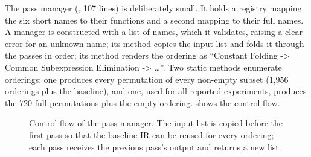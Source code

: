 The pass manager (, 107 lines) is deliberately small. It holds a registry mapping the six short names to their functions and a second mapping to their full names. A manager is constructed with a list of names, which it validates, raising a clear error for an unknown name; its  method copies the input list and folds it through the passes in order; its  method renders the ordering as ``Constant Folding -> Common Subexpression Elimination -> \ldots''. Two static methods enumerate orderings: one produces every permutation of every non-empty subset (1{,}956 orderings plus the baseline), and one, used for all reported experiments, produces the 720 full permutations plus the empty ordering.  shows the control flow.

\begin{figure}[!htb]
\centering
{}
\caption[Control flow of the pass manager.]{Control flow of the pass manager. The input list is copied before the first pass so that the baseline IR can be reused for every ordering; each pass receives the previous pass's output and returns a new list.}
\label{fig:passmanager}
\end{figure}

